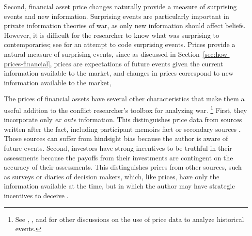 Second, financial asset price changes naturally provide a measure of surprising events and new information.
Surprising events are particularly important in private information theories of war, as only new information should affect beliefs.
However,  it is difficult for the researcher to know what was surprising to contemporaries; see \textcite{Shirkey2009a} for an attempt to code surprising events.
Prices provide a natural measure of surprising events, since as discussed in Section~\ref{sec:how-prices-financial}, prices are  expectations of future events given the current information available to the market, and changes in prices correspond to new information available to the market, 

The prices of financial assets have several other characteristics that make them a useful addition to the conflict researcher's toolbox for analyzing war.%
\footnote{See \textcite{WillardGuinnaneEtAl1996}, \textcite{north2000introd}, and \textcite{FreyKucher2000} for other  discussions on the use of price data to analyze historical events.} %
First, they incorporate only \textit{ex ante} information.
This distinguishes price data from sources written after the fact, including participant memoirs fact or secondary sources \parencites[1001]{WillardGuinnaneEtAl1996}[][188]{FreyKucher2000a}.
Those sources can suffer from hindsight bias because the author is aware of future events.
Second, investors have strong incentives to be truthful in their assessments because the payoffs from their investments are contingent on the accuracy of their assessments.
This distinguishes prices from other sources, such as surveys or diaries of decision makers, which, like prices, have only the information available at the time, but in which the author may have strategic incentives to deceive \parencite[57]{Reiter2009}.%
